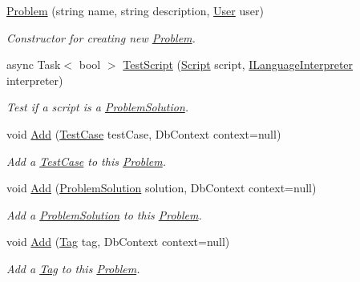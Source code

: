 \begin{DoxyCompactItemize}
\item 
\mbox{\hyperlink{class_code_a_friend_1_1_data_model_1_1_problem_a0bd8bd69a5f4d301be856222262fe7fc}{Problem}} (string name, string description, \mbox{\hyperlink{class_code_a_friend_1_1_data_model_1_1_user}{User}} user)
\begin{DoxyCompactList}\small\item\em Constructor for creating new \mbox{\hyperlink{class_code_a_friend_1_1_data_model_1_1_problem}{Problem}}.\end{DoxyCompactList}\item 
async Task$<$ bool $>$ \mbox{\hyperlink{class_code_a_friend_1_1_data_model_1_1_problem_a9b792cd3ea05e6efcd351cf138d06516}{Test\+Script}} (\mbox{\hyperlink{class_code_a_friend_1_1_data_model_1_1_script}{Script}} script, \mbox{\hyperlink{interface_code_a_friend_1_1_data_model_1_1_i_language_interpreter}{I\+Language\+Interpreter}} interpreter)
\begin{DoxyCompactList}\small\item\em Test if a script is a \mbox{\hyperlink{class_code_a_friend_1_1_data_model_1_1_problem_solution}{Problem\+Solution}}. \end{DoxyCompactList}\item 
void \mbox{\hyperlink{class_code_a_friend_1_1_data_model_1_1_problem_a3ca779158ac6d2f5ca49206214722d27}{Add}} (\mbox{\hyperlink{class_code_a_friend_1_1_data_model_1_1_test_case}{Test\+Case}} test\+Case, Db\+Context context=null)
\begin{DoxyCompactList}\small\item\em Add a \mbox{\hyperlink{class_code_a_friend_1_1_data_model_1_1_test_case}{Test\+Case}} to this \mbox{\hyperlink{class_code_a_friend_1_1_data_model_1_1_problem}{Problem}}. \end{DoxyCompactList}\item 
void \mbox{\hyperlink{class_code_a_friend_1_1_data_model_1_1_problem_a72e426e2924615d8fc813de8303bc16b}{Add}} (\mbox{\hyperlink{class_code_a_friend_1_1_data_model_1_1_problem_solution}{Problem\+Solution}} solution, Db\+Context context=null)
\begin{DoxyCompactList}\small\item\em Add a \mbox{\hyperlink{class_code_a_friend_1_1_data_model_1_1_problem_solution}{Problem\+Solution}} to this \mbox{\hyperlink{class_code_a_friend_1_1_data_model_1_1_problem}{Problem}}. \end{DoxyCompactList}\item 
void \mbox{\hyperlink{class_code_a_friend_1_1_data_model_1_1_problem_ab8ba911fa018638164edf5fe6d0076ec}{Add}} (\mbox{\hyperlink{class_code_a_friend_1_1_data_model_1_1_tag}{Tag}} tag, Db\+Context context=null)
\begin{DoxyCompactList}\small\item\em Add a \mbox{\hyperlink{class_code_a_friend_1_1_data_model_1_1_tag}{Tag}} to this \mbox{\hyperlink{class_code_a_friend_1_1_data_model_1_1_problem}{Problem}}. \end{DoxyCompactList}\end{DoxyCompactItemize}
